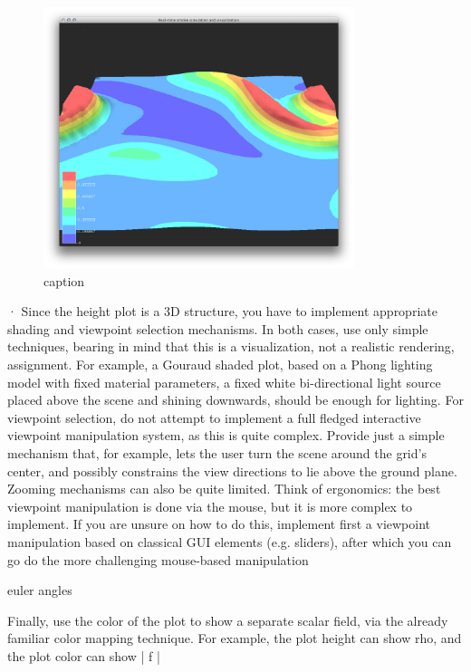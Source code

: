 \begin{figure}[htbp]
    \centering \includegraphics[height=3in]{figures/heightplot/densitydensitybanding.png}
    \caption{caption}
    \label{fig:figures_heightplot_densitydensitybanding}
\end{figure}



·        Since the height plot is a 3D structure, you have to implement appropriate shading and viewpoint selection mechanisms. In both cases, use only simple techniques, bearing in mind that this is a visualization, not a realistic rendering, assignment. For example, a Gouraud shaded plot, based on a Phong lighting model with fixed material parameters, a fixed white bi-directional light source placed above the scene and shining downwards, should be enough for lighting. For viewpoint selection, do not attempt to implement a full fledged interactive viewpoint manipulation system, as this is quite complex. Provide just a simple mechanism that, for example, lets the user turn the scene around the grid’s center, and possibly constrains the view directions to lie above the ground plane. Zooming mechanisms can also be quite limited. Think of ergonomics: the best viewpoint manipulation is done via the mouse, but it is more complex to implement. If you are unsure on how to do this, implement first a viewpoint manipulation based on classical GUI elements (e.g. sliders), after which you can go do the more challenging mouse-based manipulation

euler angles 


Finally, use the color of the plot to show a separate scalar field, via the already familiar color mapping technique. For example, the plot height can show rho, and the plot color can show | f |


